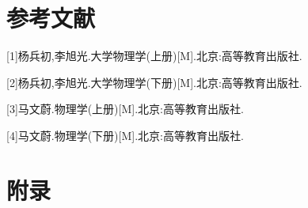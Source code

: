 \documentclass[UTF8]{ctexart}
\begin{document}
\newpage
	\section*{参考文献}
		[1]杨兵初,李旭光.大学物理学(上册)[M].北京:高等教育出版社.

		[2]杨兵初,李旭光.大学物理学(下册)[M].北京:高等教育出版社.

		[3]马文蔚.物理学(上册)[M].北京:高等教育出版社.

		[4]马文蔚.物理学(下册)[M].北京:高等教育出版社.

\newpage
\section*{附录}
\end{document}
